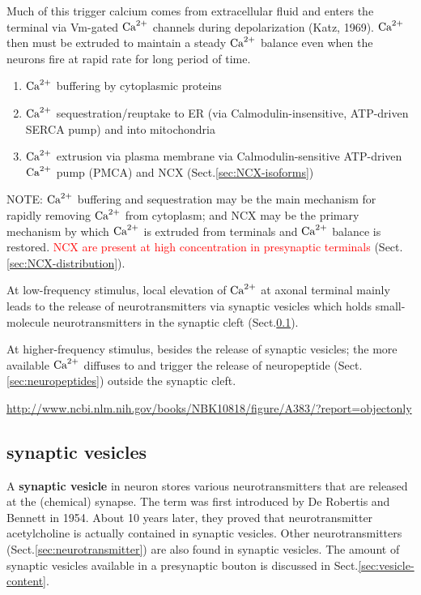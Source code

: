 Much of this trigger calcium comes from extracellular fluid and enters the
terminal via Vm-gated ${\text{Ca}^{2+}}$ channels during depolarization (Katz, 1969).
${\text{Ca}^{2+}}$ then must be extruded to maintain a steady ${\text{Ca}^{2+}}$ balance even when the
neurons fire at rapid rate for long period of time.
\begin{enumerate}
  \item ${\text{Ca}^{2+}}$ buffering by cytoplasmic proteins
  
  \item ${\text{Ca}^{2+}}$ sequestration/reuptake to ER (via Calmodulin-insensitive,
  ATP-driven SERCA pump) and into mitochondria
  
  \item ${\text{Ca}^{2+}}$ extrusion via plasma membrane via Calmodulin-sensitive ATP-driven
  ${\text{Ca}^{2+}}$ pump (PMCA) and NCX (Sect.\ref{sec:NCX-isoforms})
\end{enumerate}
NOTE: ${\text{Ca}^{2+}}$ buffering and sequestration may be the main mechanism for rapidly
removing ${\text{Ca}^{2+}}$ from cytoplasm; and NCX may be the primary mechanism by which
${\text{Ca}^{2+}}$ is extruded from terminals and ${\text{Ca}^{2+}}$ balance is restored.
\textcolor{red}{NCX  are present at high concentration in presynaptic
terminals} (Sect.\ref{sec:NCX-distribution}).

At low-frequency stimulus, local elevation of ${\text{Ca}^{2+}}$ at axonal terminal mainly
leads to the release of neurotransmitters via synaptic vesicles which holds
small-molecule neurotransmitters in the synaptic cleft
(Sect.\ref{sec:synaptic-vesicles}).

At higher-frequency stimulus, besides the release of synaptic vesicles; the more
available ${\text{Ca}^{2+}}$ diffuses to and trigger the release of neuropeptide
(Sect.\ref{sec:neuropeptides}) outside the synaptic cleft.


\url{http://www.ncbi.nlm.nih.gov/books/NBK10818/figure/A383/?report=objectonly}


\subsection{synaptic vesicles}
\label{sec:synaptic-vesicles}

A {\bf synaptic vesicle} in neuron stores various neurotransmitters that are
released at the (chemical) synapse. The term was first introduced by De Robertis
and Bennett in 1954. About 10 years later, they proved that neurotransmitter
acetylcholine is actually contained in synaptic vesicles. Other
neurotransmitters (Sect.\ref{sec:neurotransmitter}) are also found in synaptic
vesicles. The amount of synaptic vesicles available in a presynaptic bouton is
discussed in Sect.\ref{sec:vesicle-content}.

